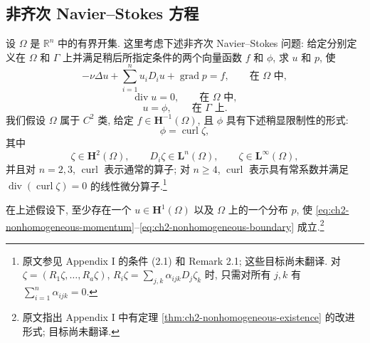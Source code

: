 \hypertarget{chapter-02-page-131}{}
\subsection{非齐次 Navier--Stokes 方程}
\label{subsec:ch2-nonhomogeneous-navier-stokes}

设 $\Omega$ 是 $\mathbb R^n$ 中的有界开集. 这里考虑下述非齐次 Navier--Stokes 问题: 给定分别定义在 $\Omega$ 和 $\Gamma$ 上并满足稍后所指定条件的两个向量函数 $f$ 和 $\phi$, 求 $u$ 和 $p$, 使
\begin{equation}
-\nu\Delta u+\sum_{i=1}^{n}u_iD_i u+\operatorname{grad}p=f,
\qquad\text{在 }\Omega\text{ 中},
\label{eq:ch2-nonhomogeneous-momentum}
\end{equation}
\begin{equation}
\operatorname{div}u=0,
\qquad\text{在 }\Omega\text{ 中},
\label{eq:ch2-nonhomogeneous-incompressibility}
\end{equation}
\begin{equation}
u=\phi,
\qquad\text{在 }\Gamma\text{ 上}.
\label{eq:ch2-nonhomogeneous-boundary}
\end{equation}
我们假设 $\Omega$ 属于 $C^2$ 类, 给定 $f\in\mathbf H^{-1}(\Omega)$, 且 $\phi$ 具有下述稍显限制性的形式:
\begin{equation}
\phi=\operatorname{curl}\zeta,
\label{eq:ch2-boundary-data-curl}
\end{equation}
其中
\begin{equation}
\zeta\in\mathbf H^2(\Omega),
\qquad D_i\zeta\in\mathbf L^n(\Omega),
\qquad\zeta\in\mathbf L^\infty(\Omega),
\label{eq:ch2-boundary-potential-regularity}
\end{equation}
并且对 $n=2,3$, $\operatorname{curl}$ 表示通常的算子; 对 $n\geq4$, $\operatorname{curl}$ 表示具有常系数并满足 $\operatorname{div}(\operatorname{curl}\zeta)=0$ 的线性微分算子.\footnote{原文参见 Appendix I 的条件 (2.1) 和 Remark 2.1; 这些目标尚未翻译. 对 $\zeta=(R_1\zeta,\ldots,R_a\zeta)$, $R_i\zeta=\sum_{j,k}\alpha_{ijk}D_j\zeta_k$ 时, 只需对所有 $j,k$ 有 $\sum_{i=1}^n\alpha_{ijk}=0$.}

\begin{Theorem}
\label{thm:ch2-nonhomogeneous-existence}
在上述假设下, 至少存在一个 $u\in\mathbf H^1(\Omega)$ 以及 $\Omega$ 上的一个分布 $p$, 使 \eqref{eq:ch2-nonhomogeneous-momentum}--\eqref{eq:ch2-nonhomogeneous-boundary} 成立.\footnote{原文指出 Appendix I 中有定理 \ref{thm:ch2-nonhomogeneous-existence} 的改进形式; 目标尚未翻译.}
\end{Theorem}

